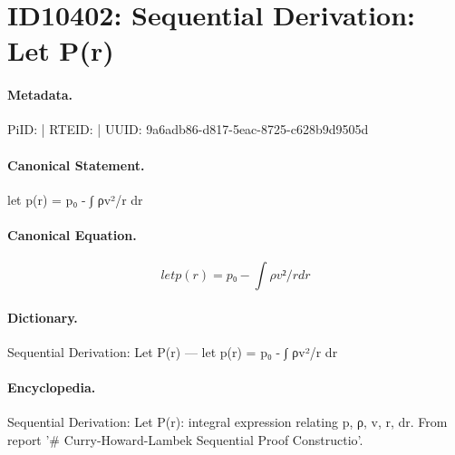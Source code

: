 \section*{ID10402: Sequential Derivation: Let P(r)}
\paragraph{Metadata.}
PiID:  | RTEID:  | UUID: 9a6adb86-d817-5eac-8725-c628b9d9505d

\paragraph{Canonical Statement.}
let p(r) = p₀ - ∫ ρv²/r dr

\paragraph{Canonical Equation.}
\[
let p(r) = p₀ - ∫ ρv²/r dr
\]

\paragraph{Dictionary.}
Sequential Derivation: Let P(r) — let p(r) = p₀ - ∫ ρv²/r dr

\paragraph{Encyclopedia.}
Sequential Derivation: Let P(r): integral expression relating p, ρ, v, r, dr. From report '\# Curry-Howard-Lambek Sequential Proof Constructio'.
